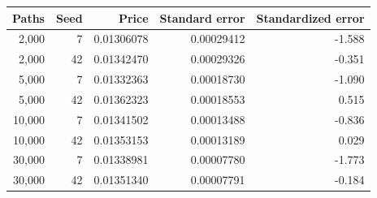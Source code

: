 \begin{tabular}{rrrrr}
\toprule
Paths & Seed & Price & Standard error & Standardized error \\
\midrule
2,000 & 7 & 0.01306078 & 0.00029412 & -1.588 \\
2,000 & 42 & 0.01342470 & 0.00029326 & -0.351 \\
5,000 & 7 & 0.01332363 & 0.00018730 & -1.090 \\
5,000 & 42 & 0.01362323 & 0.00018553 & 0.515 \\
10,000 & 7 & 0.01341502 & 0.00013488 & -0.836 \\
10,000 & 42 & 0.01353153 & 0.00013189 & 0.029 \\
30,000 & 7 & 0.01338981 & 0.00007780 & -1.773 \\
30,000 & 42 & 0.01351340 & 0.00007791 & -0.184 \\
\bottomrule
\end{tabular}

